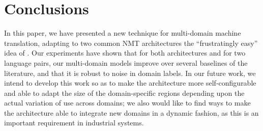 \documentclass[11pt,a4paper]{article}
\newcommand{\fyTodo}[1]{\Todo[FY:]{\textcolor{orange}{#1}}}
\begin{document}


\section{Conclusions}
In this paper, we have presented a new technique for multi-domain machine translation, adapting to two common NMT architectures the ``frustratingly easy'' idea of \cite{Daume07frustratingly}. Our experiments have shown that for both architectures and for two language pairs, our multi-domain models improve over several baselines of the literature, and that it is robust to noise in domain labels. In our future work, we intend to develop this work so as to make the architecture more self-configurable and able to adapt the size of the domain-specific regions depending upon the actual variation of use across domains; we also would like to find ways to make the architecture able to integrate new domains in a dynamic fashion, as this is an important requirement in industrial systems.




\end{document}

